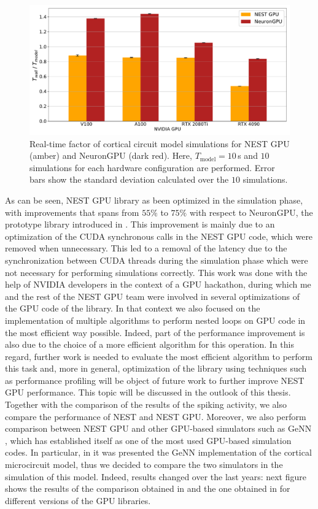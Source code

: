 \documentclass[a4paper, 12pt, twoside, openright]{book}
\begin{document}
\begin{figure}[H]
    \centering
    \includegraphics[width=\columnwidth]{figures/cm_nestgpu_neurongpu_RTF.pdf}
    \caption{Real-time factor of cortical circuit model simulations for NEST GPU (amber) and NeuronGPU (dark red). Here, $T_{\text{model}}=10$\,s and $10$ simulations for each hardware configuration are performed. Error bars show the standard deviation calculated over the $10$ simulations.}
    \label{fig:nest_nestgpu_RTF}
\end{figure}

As can be seen, NEST GPU library as been optimized in the simulation phase, with improvements that spans from $55\%$ to $75\%$ with respect to NeuronGPU, the prototype library introduced in \cite{Golosio2021}. This improvement is mainly due to an optimization of the CUDA synchronous calls in the NEST GPU code, which were removed when unnecessary. This led to a removal of the latency due to the synchronization between CUDA threads during the simulation phase which were not necessary for performing simulations correctly. This work was done with the help of NVIDIA developers in the context of a GPU hackathon, during which me and the rest of the NEST GPU team were involved in several optimizations of the GPU code of the library. In that context we also focused on the implementation of multiple algorithms to perform nested loops on GPU code in the most efficient way possible. Indeed, part of the performance improvement is also due to the choice of a more efficient algorithm for this operation. In this regard, further work is needed to evaluate the most efficient algorithm to perform this task and, more in general, optimization of the library using techniques such as performance profiling will be object of future work to further improve NEST GPU performance. This topic will be discussed in the outlook of this thesis.\\
Together with the comparison of the results of the spiking activity, we also compare the performance of NEST and NEST GPU. Moreover, we also perform comparison between NEST GPU and other GPU-based simulators such as GeNN \cite{Yavuz2016}, which has established itself as one of the most used GPU-based simulation codes. In particular, in \cite{Knight2018} it was presented the GeNN implementation of the cortical microcircuit model, thus we decided to compare the two simulators in the simulation of this model. Indeed, results changed over the last years: next figure shows the results of the comparison obtained in \cite{Golosio2021} and the one obtained in \cite{Golosio2023} for different versions of the GPU libraries.
\end{document}
